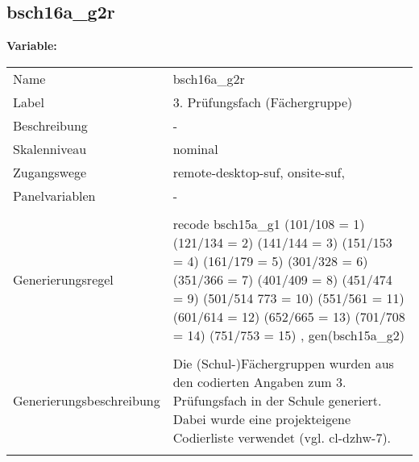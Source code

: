 	
	
	\subsection{bsch16a\_g2r}
	\label{subSection:bsch16a_g2r}

	\noindent\textbf{Variable:}\\
		\begin{tabular}{lL{11.3cm}}
			\label{tableVariable:bsch16a_g2r}
			Name & bsch16a\_g2r \\
			Label & 3. Prüfungsfach (Fächergruppe) \\
			Beschreibung & - \\
			Skalenniveau & nominal \\
			Zugangswege &
				remote-desktop-suf,
				onsite-suf,
 \\
			Panelvariablen & -
			 \\
			 \\
					Generierungsregel & recode bsch15a\_g1 (101/108 = 1) (121/134 = 2) (141/144 = 3) 
(151/153 = 4) (161/179 = 5) (301/328 = 6) (351/366 = 7) 
(401/409 = 8) (451/474 = 9) (501/514 773 = 10) (551/561 = 11) 
(601/614 = 12) (652/665 = 13) (701/708 = 14) (751/753 = 15)
, gen(bsch15a\_g2) \\
				 \\
					Generierungsbeschreibung & Die (Schul-)Fächergruppen wurden aus den codierten Angaben zum 3. Prüfungsfach in der Schule generiert. Dabei wurde eine projekteigene Codierliste verwendet (vgl. cl-dzhw-7).
				 \\	
			 \\
		\end{tabular}






